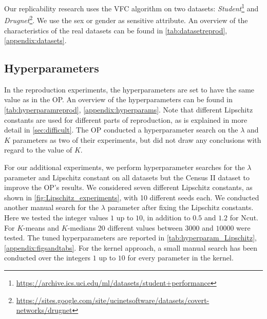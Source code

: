 Our replicability research uses the VFC algorithm on two datasets: \textit{Student}\footnote{\url{https://archive.ics.uci.edu/ml/datasets/student+performance}} and \textit{Drugnet}\footnote{\url{https://sites.google.com/site/ucinetsoftware/datasets/covert-networks/drugnet}}. We use the sex or gender as sensitive attribute. An overview of the characteristics of the real datasets can be found in \autoref{tab:datasetreprod}, \autoref{appendix:datasets}. 


\subsection{Hyperparameters}
In the reproduction experiments, the hyperparameters are set to have the same value as in the OP. An overview of the hyperparameters can be found in \autoref{tab:hyperparamreprod}, \autoref{appendix:hyperparams}. Note that different Lipschitz constants are used for different parts of reproduction, as is explained in more detail in \autoref{sec:difficult}. The OP conducted a hyperparameter search on the $\lambda$ and $K$ parameters as two of their experiments, but did not draw any conclusions with regard to the value of $K$. 

For our additional experiments, we perform hyperparameter searches for the $\lambda$ parameter and Lipschitz constant on all datasets but the Census II dataset to improve the OP's results. We considered seven different Lipschitz constants, as shown in \autoref{fig:Lipschitz_experiments}, with 10 different seeds each. We conducted another manual search for the $\lambda$ parameter after fixing the Lipschitz constants. Here we tested the integer values $1$ up to $10$, in addition to $0.5$ and $1.2$ for Ncut. For $K$-means and $K$-medians 20 different values between $3000$ and $10000$ were tested. The tuned hyperparameters are reported in \autoref{tab:hyperparam_Lipschitz}, \autoref{appendix:figsandtabs}. For the kernel approach, a small manual search has been conducted over the integers $1$ up to $10$ for every parameter in the kernel.

